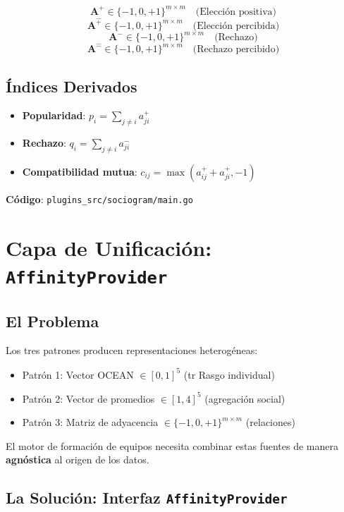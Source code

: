 \documentclass[12pt,a4paper]{article}
\begin{document}
\[
\mathbf{A}^{+} \in \{-1, 0, +1\}^{m \times m} \quad \text{(Elección positiva)}
\]
\[
\mathbf{A}^{\hat{+}} \in \{-1, 0, +1\}^{m \times m} \quad \text{(Elección percibida)}
\]
\[
\mathbf{A}^{-} \in \{-1, 0, +1\}^{m \times m} \quad \text{(Rechazo)}
\]
\[
\mathbf{A}^{\hat{-}} \in \{-1, 0, +1\}^{m \times m} \quad \text{(Rechazo percibido)}
\]

\subsection{Índices Derivados}

\begin{itemize}
    \item \textbf{Popularidad}: $p_i = \sum_{j \neq i} a^{+}_{ji}$
    \item \textbf{Rechazo}: $q_i = \sum_{j \neq i} a^{-}_{ji}$
    \item \textbf{Compatibilidad mutua}: $c_{ij} = \max(a^{+}_{ij} + a^{+}_{ji}, -1)$
\end{itemize}

\textbf{Código}: \texttt{plugins\_src/sociogram/main.go}

\section{Capa de Unificación: \texttt{AffinityProvider}}
\label{sec:affinity}

\subsection{El Problema}

Los tres patrones producen representaciones heterogéneas:
\begin{itemize}
    \item Patrón 1: Vector OCEAN $\in [0, 1]^5$ (tr Rasgo individual)
    \item Patrón 2: Vector de promedios $\in [1, 4]^5$ (agregación social)
    \item Patrón 3: Matriz de adyacencia $\in \{-1, 0, +1\}^{m \times m}$ (relaciones)
\end{itemize}

El motor de formación de equipos necesita combinar estas fuentes de manera \textbf{agnóstica} al origen de los datos.

\subsection{La Solución: Interfaz \texttt{AffinityProvider}}
\end{document}
